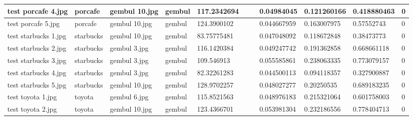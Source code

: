 \begin{landscape}
\begin{longtable}{|p{2cm}|p{1.5cm}|p{2cm}|p{1.5cm}|p{2cm}|p{1cm}|p{2cm}|p{2cm}|p{2cm}|p{2cm}|p{1cm}|}
		test porcafe 4.jpg   & porcafe          & gembul 10.jpg         & gembul                      & 117.2342694           &                         &                            & 0.04984045            & 0.121260166           & 0.418880463              & 0                \\ \hline
		test porcafe 5.jpg   & porcafe          & gembul 10.jpg         & gembul                      & 124.3900102           &                         &                            & 0.044667959           & 0.163007975           & 0.57552743               & 0                \\ \hline
		test starbucks 1.jpg & starbucks        & gembul 10.jpg         & gembul                      & 83.75775481           &                         &                            & 0.047048092           & 0.118672848           & 0.38473773               & 0                \\ \hline
		test starbucks 2.jpg & starbucks        & gembul 3.jpg          & gembul                      & 116.1420384           &                         &                            & 0.049247742           & 0.191362858           & 0.668661118              & 0                \\ \hline
		test starbucks 3.jpg & starbucks        & gembul 3.jpg          & gembul                      & 109.546913            &                         &                            & 0.055585861           & 0.238063335           & 0.773079157              & 0                \\ \hline
		test starbucks 4.jpg & starbucks        & gembul 3.jpg          & gembul                      & 82.32261283           &                         &                            & 0.044500113           & 0.094118357           & 0.327900887              & 0                \\ \hline
		test starbucks 5.jpg & starbucks        & gembul 10.jpg         & gembul                      & 128.9702257           &                         &                            & 0.048027277           & 0.20250535            & 0.689183235              & 0                \\ \hline
		test toyota 1.jpg    & toyota           & gembul 6.jpg          & gembul                      & 115.8521563           &                         &                            & 0.048976183           & 0.215321064           & 0.601758003              & 0                \\ \hline
		test toyota 2.jpg    & toyota           & gembul 10.jpg         & gembul                      & 123.4366701           &                         &                            & 0.053981304           & 0.232186556           & 0.778404713              & 0                \\ \hline

\end{longtable}
\end{landscape}
